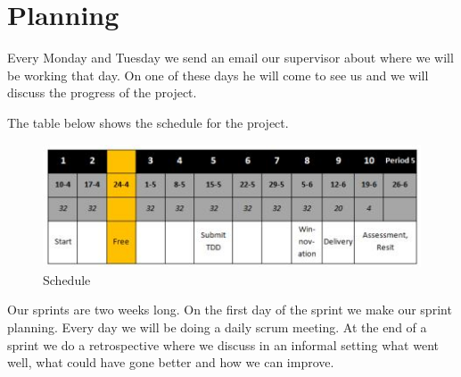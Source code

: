 \section{Planning}
Every Monday and Tuesday we send an email our supervisor about where we will be working that day. On one of these days he will come to see us and we will discuss the progress of the project. 

The table below shows the schedule for the project.
\begin{figure}[!htb]
    \centering
    \includegraphics[scale=1.25]{images/schedule.JPG}
    \caption{Schedule}\label{fig:fuzzy-distance}
\end{figure}

Our sprints are two weeks long. On the first day of the sprint we make our sprint planning. Every day we will be doing a daily scrum meeting. At the end of a sprint we do a retrospective where we discuss in an informal setting what went well, what could have gone better and how we can improve.

